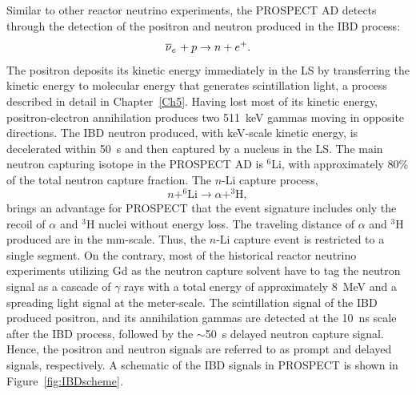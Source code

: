 	Similar to other reactor neutrino experiments, the PROSPECT AD detects \nuebar through the detection of the positron and neutron produced in the IBD process:
	\begin{equation}
        \overline{\nu }_{e}\hspace{1pt} + p \rightarrow n + e^+.
    \end{equation}	    
	The positron deposits its kinetic energy immediately in the LS by transferring the kinetic energy to molecular energy that generates scintillation light, a process described in detail in Chapter~\ref{Ch5}.
	Having lost most of its kinetic energy, positron-electron annihilation produces two 511~keV gammas moving in opposite directions. 
	The IBD neutron produced, with keV-scale kinetic energy, is decelerated within 50~\textmu s and then captured by a nucleus in the LS. 
	The main neutron capturing isotope in the PROSPECT AD is $^6$Li, with approximately 80\% of the total neutron capture fraction.
	The $n$-Li capture process,
	\begin{equation}
       	n+^6\textrm{Li} \rightarrow \alpha + ^3\textrm{H},
    \end{equation}
    brings an advantage for PROSPECT that the event signature includes only the recoil of $\alpha$ and $^3$H nuclei without energy loss. 
    The traveling distance of $\alpha$ and $^3$H produced are in the mm-scale.
    Thus, the $n$-Li capture event is restricted to a single segment.
    On the contrary, most of the historical reactor neutrino experiments utilizing Gd as the neutron capture solvent have to tag the neutron signal as a cascade of $\gamma$ rays with a total energy of approximately 8~MeV and a spreading light signal at the meter-scale.
 	The scintillation signal of the IBD produced positron, and its annihilation gammas are detected at the 10~ns scale after the IBD process, followed by the $\sim$50~\textmu s delayed neutron capture signal. 
 	Hence, the positron and neutron signals are referred to as prompt and delayed signals, respectively.
	A schematic of the IBD signals in PROSPECT is shown in Figure~\ref{fig:IBDscheme}.
